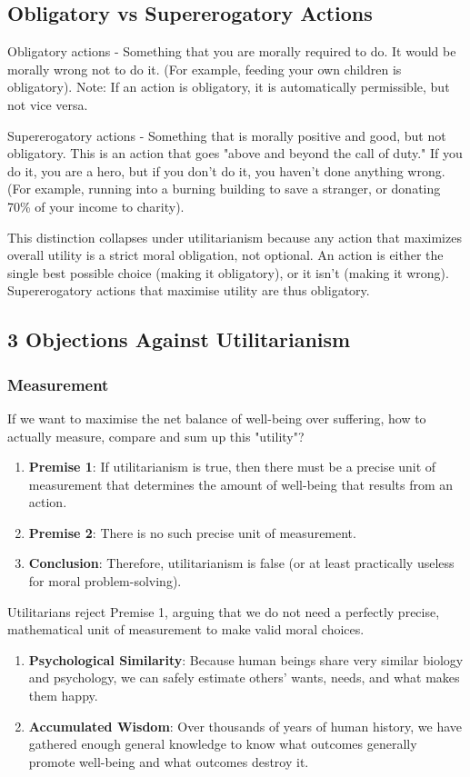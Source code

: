 \documentclass[12pt]{article}
\begin{document}
\subsection{Obligatory vs Supererogatory Actions}
Obligatory actions - Something that you are morally required to do. It would be morally wrong not to do it. (For example, feeding your own children is obligatory). Note: If an action is obligatory, it is automatically permissible, but not vice versa.

\noindent Supererogatory actions - Something that is morally positive and good, but not obligatory. This is an action that goes "above and beyond the call of duty." If you do it, you are a hero, but if you don't do it, you haven't done anything wrong. (For example, running into a burning building to save a stranger, or donating 70\% of your income to charity).

\noindent This distinction collapses under utilitarianism because any action that maximizes overall utility is a strict moral obligation, not optional.
An action is either the single best possible choice (making it obligatory), or it isn't (making it wrong).
Supererogatory actions that maximise utility are thus obligatory.

\subsection{3 Objections Against Utilitarianism}
\subsubsection{Measurement}
If we want to maximise the net balance of well-being over suffering,
how to actually measure, compare and sum up this "utility"?
\begin{enumerate}
    \item \textbf{Premise 1}: If utilitarianism is true, then there must be a precise unit of measurement that determines the amount of well-being that results from an action.
    \item \textbf{Premise 2}: There is no such precise unit of measurement.
    \item \textbf{Conclusion}: Therefore, utilitarianism is false (or at least practically useless for moral problem-solving).
\end{enumerate}
Utilitarians reject Premise 1, arguing that we do not need a perfectly precise, mathematical unit of measurement to make valid moral choices.
\begin{enumerate}
    \item \textbf{Psychological Similarity}: Because human beings share very similar biology and psychology, we can safely estimate others' wants, needs, and what makes them happy.
    \item \textbf{Accumulated Wisdom}: Over thousands of years of human history, we have gathered enough general knowledge to know what outcomes generally promote well-being and what outcomes destroy it.
\end{enumerate}
\end{document}
